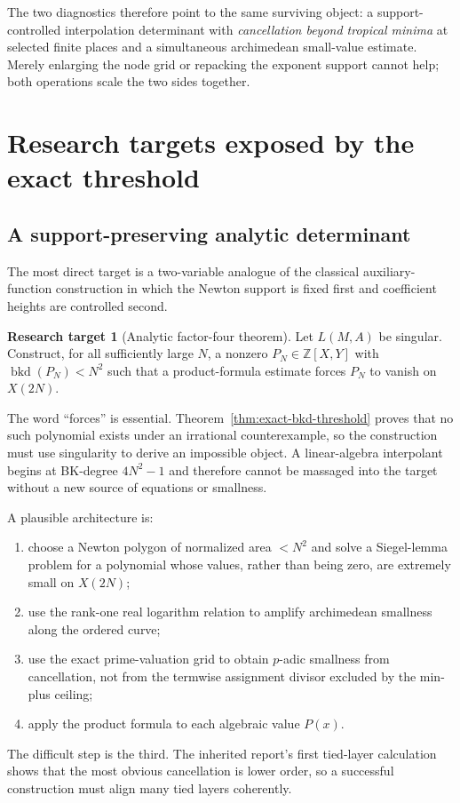 \documentclass[11pt,oneside]{article}
\theoremstyle{definition}
\newtheorem{target}[theorem]{Research target}
\theoremstyle{remark}
\newcommand{\Z}{\mathbb Z}
\begin{document}
The two diagnostics therefore point to the same surviving object: a support-controlled
interpolation determinant with \emph{cancellation beyond tropical minima} at selected finite
places and a simultaneous archimedean small-value estimate.  Merely enlarging the node grid or
repacking the exponent support cannot help; both operations scale the two sides together.

\section{Research targets exposed by the exact threshold}
\label{sec:mc-research-targets}

\subsection{A support-preserving analytic determinant}

The most direct target is a two-variable analogue of the classical auxiliary-function
construction in which the Newton support is fixed first and coefficient heights are controlled
second.

\begin{target}[Analytic factor-four theorem]
\label{target:analytic-factor-four}
Let $L(M,A)$ be singular.  Construct, for all sufficiently large $N$, a nonzero
$P_N\in\Z[X,Y]$ with $\operatorname{bkd}(P_N)<N^2$ such that a product-formula estimate forces
$P_N$ to vanish on $X(2N)$.
\end{target}

The word ``forces'' is essential.  Theorem~\ref{thm:exact-bkd-threshold} proves that no such
polynomial exists under an irrational counterexample, so the construction must use singularity
to derive an impossible object.  A linear-algebra interpolant begins at BK-degree $4N^2-1$ and
therefore cannot be massaged into the target without a new source of equations or smallness.

A plausible architecture is:
\begin{enumerate}
\item choose a Newton polygon of normalized area $<N^2$ and solve a Siegel-lemma problem for a
polynomial whose values, rather than being zero, are extremely small on $X(2N)$;
\item use the rank-one real logarithm relation to amplify archimedean smallness along the
ordered curve;
\item use the exact prime-valuation grid to obtain $p$-adic smallness from cancellation, not
from the termwise assignment divisor excluded by the min-plus ceiling;
\item apply the product formula to each algebraic value $P(x)$.
\end{enumerate}
The difficult step is the third.  The inherited report's first tied-layer calculation shows
that the most obvious cancellation is lower order, so a successful construction must align
many tied layers coherently.
\end{document}
